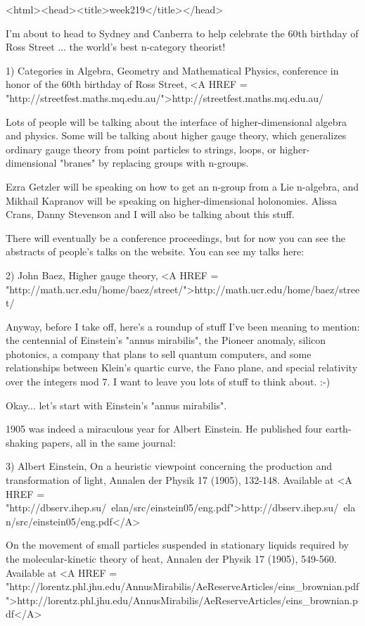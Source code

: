 <html><head><title>week219</title></head>


I'm about to head to Sydney and Canberra to help celebrate the 60th birthday of 
Ross Street ... the world's best n-category theorist!

1) Categories in Algebra, Geometry and Mathematical Physics, conference
in honor of the 60th birthday of Ross Street, 
   <A HREF = "http://streetfest.maths.mq.edu.au/">http://streetfest.maths.mq.edu.au/

Lots of people will be talking about the interface of higher-dimensional
algebra and physics.  Some will be talking about higher
gauge theory, which generalizes ordinary gauge theory from point particles
to strings, loops,
or higher-dimensional "branes" by replacing groups with n-groups.

Ezra Getzler will be speaking on how to get an n-group from a Lie n-algebra, 
and Mikhail Kapranov will be speaking on higher-dimensional holonomies.  
Alissa Crans, Danny Stevenson and I will also be talking about this stuff. 

There will eventually be a conference proceedings, but for now you can see
the abstracts of people's talks on the website.  You can see my talks here:

2) John Baez, Higher gauge theory, 
<A HREF = "http://math.ucr.edu/home/baez/street/">http://math.ucr.edu/home/baez/street/

Anyway, before I take off, here's a roundup of stuff I've been meaning to 
mention: the centennial of Einstein's "annus mirabilis", 
the Pioneer anomaly, 
silicon photonics, a company that plans to sell quantum computers, and some 
relationships between Klein's quartic curve, the Fano plane, and special relativity 
over the integers mod 7.  I want to leave you lots of stuff to think about.  :-)  

Okay... let's start with Einstein's "annus mirabilis".

1905 was indeed a miraculous year for Albert Einstein.  He published four 
earth-shaking papers, all in the same journal:

3) Albert Einstein, On a heuristic viewpoint concerning the production and 
   transformation of light, Annalen der Physik 17 (1905), 132-148.  Available at 
   <A HREF = "http://dbserv.ihep.su/~elan/src/einstein05/eng.pdf">http://dbserv.ihep.su/~elan/src/einstein05/eng.pdf</A> 

   On the movement of small particles suspended in stationary liquids required by 
   the molecular-kinetic theory of heat, Annalen der Physik 17 (1905), 549-560.
   Available at 
   <A HREF = "http://lorentz.phl.jhu.edu/AnnusMirabilis/AeReserveArticles/eins_brownian.pdf">http://lorentz.phl.jhu.edu/AnnusMirabilis/AeReserveArticles/eins_brownian.pdf</A>

